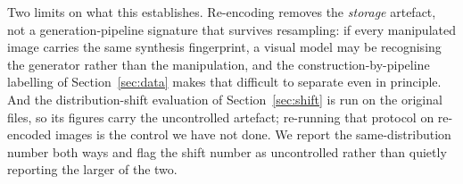 Two limits on what this establishes. Re-encoding removes the \emph{storage}
artefact, not a generation-pipeline signature that survives resampling: if
every manipulated image carries the same synthesis fingerprint, a visual model
may be recognising the generator rather than the manipulation, and the
construction-by-pipeline labelling of Section~\ref{sec:data} makes that
difficult to separate even in principle. And the distribution-shift evaluation
of Section~\ref{sec:shift} is run on the original files, so its figures carry
the uncontrolled artefact; re-running that protocol on re-encoded images is the
control we have not done. We report the same-distribution number both ways and
flag the shift number as uncontrolled rather than quietly reporting the larger
of the two.

%
%
%
%
%
%
